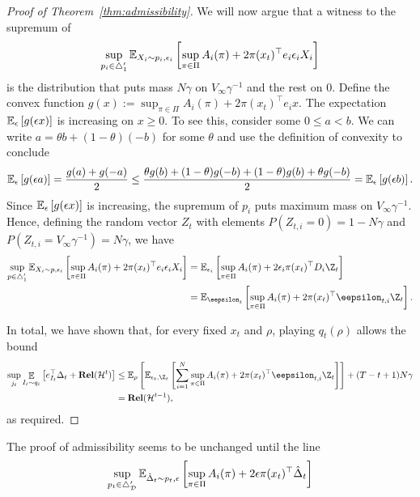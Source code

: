 \documentclass{article}
\newcommand{\rel}{\mathbf{Rel}}
\newcommand{\hist}{{\mathcal H}}
\begin{document}
\begin{proof}[Proof of Theorem~\ref{thm:admissibility}]
We will now argue that a witness to the supremum of 
\begin{align*}
    \sup_{p_i\in\triangle_1'}
  \mathbb E_{X_i\sim p_i,\epsilon_i}\left[
        \sup_{\pi\in\Pi} A_i(\pi)+
        2\pi(x_t)^\top e_i \epsilon_i X_i
        \right]
\end{align*}
is the distribution that puts mass $N\gamma$ on $V_\infty\gamma^{-1}$ and the rest on $0$. Define the convex function 
$g(x) :=  \sup_{\pi\in\Pi} A_i(\pi)+ 2\pi(x_t)^\top e_i x$. The expectation $\mathbb E_{\epsilon}\left[ g(\epsilon x)\right]$ is increasing on $x\geq 0$. To see this, consider some $0\leq a<b$. We can write $a = \theta b + (1-\theta)(-b)$ for some $\theta$ and use the definition of convexity to conclude 
 \begin{align*}
   \mathbb E_{\epsilon}\left[ g(\epsilon a) \right]
   = 
   \frac{g(a)+g(-a)}{2}
   \leq
   \frac{\theta g(b)+(1-\theta)g(-b)
   +(1-\theta) g(b)+\theta g(-b)
   }{2}
   =
   \mathbb E_{\epsilon}\left[ g(\epsilon b) \right].
 \end{align*}
 Since $\mathbb E_{\epsilon}\left[ g(\epsilon x)\right]$ is increasing, the supremum of $p_i$ puts maximum mass on $V_\infty\gamma^{-1}$. Hence, defining the random vector $Z_{t}$ with elements $P(Z_{t,i} = 0) = 1-N\gamma$ and $P( Z_{t,i} = V_\infty\gamma^{-1}) = N\gamma$, we have
 \begin{align*}
    \sup_{p\in\triangle_1'}
  \ex_{X_i\sim p,\epsilon_i}\left[
        \sup_{\pi\in\Pi} A_i(\pi)+
        2\pi(x_t)^\top e_i \epsilon_i X_i
        \right]
   &=
  \ex_{\epsilon_i}\left[
        \sup_{\pi\in\Pi} A_i(\pi)+
        2\epsilon_i\pi(x_t)^\top D_i \Z_t
   \right]\\
      &=
  \ex_{\eepsilon_t}\left[
        \sup_{\pi\in\Pi} A_i(\pi)+
        2\pi(x_t)^\top \eepsilon_{t,i} \Z_t
        \right].
\end{align*}

In total, we have shown that, for every fixed $x_t$ and $\rho$, playing $q_t(\rho)$ allows the bound
\begin{align*}
    \sup_{j_t} \mathop{\ex}_{I_t\sim q_t}\left[ e_{I_t}^\top \Delta_t
  + \rel(\hist^t)\right]
  &\leq
    \ex_\rho \left[
  \ex_{\epsilon_t, \Z_t}\left[
  \sum_{i=1}^N
        \sup_{\pi\in\Pi} A_i(\pi)+
        2\pi(x_t)^\top \eepsilon_{t,i} \Z_t
  \right]
  \right]
  + (T-t+1)N\gamma\\
  &=
  \rel(\hist^{t-1}),
\end{align*}
as required.
\end{proof}

The proof of admissibility seems to be unchanged until the line
\[
      \sup_{p_t\in\triangle_{\mathcal D}'}
      \mathbb E_{\hat\Delta_t\sim p_t,\epsilon}\left[
        \sup_{\pi\in\Pi} A_i(\pi)+
        2\epsilon\pi(x_t)^\top
        \hat\Delta_t
      \right]
\]
\end{document}
